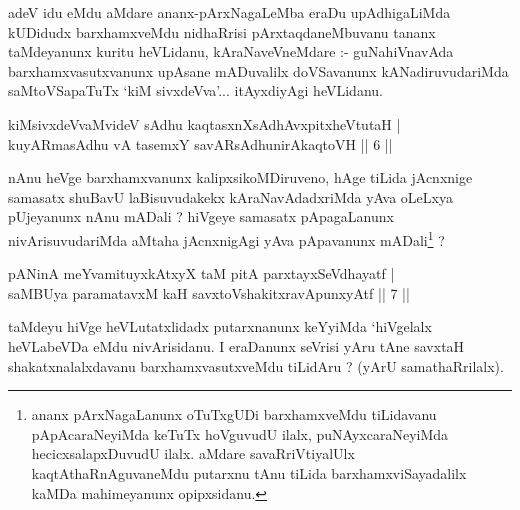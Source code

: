 \begin{artha}
adeV idu eMdu aMdare ananx-pArxNagaLeMba eraDu upAdhigaLiMda kUDidudx barxhamxveMdu nidhaRrisi pArxtaqdaneMbuvanu tananx taMdeyanunx kuritu heVLidanu, kAraNaveVneMdare :- guNahiVnavAda barxhamxvasutxvanunx upAsane mADuvalilx doVSavanunx kANadiruvudariMda saMtoVSapaTuTx `kiM sivxdeVva'... itAyxdiyAgi heVLidanu.
\end{artha}

\begin{shl}
kiMsivxdeVvaMvideV sAdhu kaqtasxnXsAdhAvxpitxheVtutaH | \\
kuyARmasAdhu vA tasemxY savARsAdhunirAkaqtoVH \hfill ||  6 || 
\end{shl}

\begin{artha}
nAnu heVge barxhamxvanunx kalipxsikoMDiruveno, hAge tiLida jAcnxnige samasatx shuBavU laBisuvudakekx kAraNavAdadxriMda yAva oLeLxya pUjeyanunx nAnu mADali ? hiVgeye samasatx pApagaLanunx nivArisuvudariMda aMtaha jAcnxnigAgi yAva pApavanunx mADali\footnote{ananx pArxNagaLanunx oTuTxgUDi barxhamxveMdu tiLidavanu pApAcaraNeyiMda keTuTx hoVguvudU ilalx, puNAyxcaraNeyiMda hecicxsalapxDuvudU ilalx. aMdare savaRriVtiyalUlx kaqtAthaRnAguvaneMdu putarxnu tAnu tiLida barxhamxviSayadalilx kaMDa mahimeyanunx opipxsidanu.} ?
\end{artha}


\begin{shl}
pANinA meYvamituyxkAtxyX taM pitA parxtayxSeVdhayatf | \\
\footnotemark{}saMBUya paramatavxM kaH savxtoVshakitxravApunxyAtf \hfill ||  7 || 
\end{shl}

\begin{artha}
taMdeyu hiVge heVLutatxlidadx putarxnanunx keYyiMda `hiVgelalx heVLabeVDa eMdu nivArisidanu. I eraDanunx seVrisi yAru tAne savxtaH shakatxnalalxdavanu barxhamxvasutxveMdu tiLidAru ? (yArU samathaRrilalx).
\end{artha}


